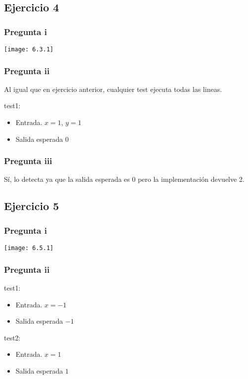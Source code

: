 \subsection{Ejercicio 4}
\subsubsection{Pregunta i}
\texttt{[image: 6.3.1]}

\subsubsection{Pregunta ii}
Al igual que en ejercicio anterior, cualquier test ejecuta todas las lineas.

test1:
\begin{itemize}
    \item Entrada. $ x = 1 $, $ y = 1 $
    \item Salida esperada $ 0 $
\end{itemize}

\subsubsection{Pregunta iii}
Sí, lo detecta ya que la salida esperada es 0 pero la implementación devuelve 2.

\subsection{Ejercicio 5}
\subsubsection{Pregunta i}
\texttt{[image: 6.5.1]}

\subsubsection{Pregunta ii}
test1:
\begin{itemize}
    \item Entrada. $ x = -1 $
    \item Salida esperada $ -1 $
\end{itemize}

test2:
\begin{itemize}
    \item Entrada. $ x = 1 $
    \item Salida esperada $ 1 $
\end{itemize}

